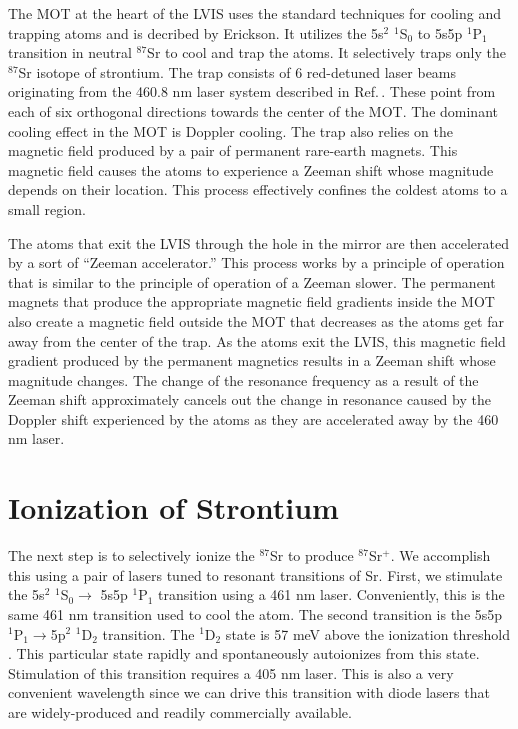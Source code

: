 The MOT at the heart of the LVIS uses the standard techniques for cooling and trapping atoms and is decribed by Erickson\cite{cjeDiss}. It utilizes the 5s$^2$ $^1$S$_0$ to 5s5p $^1$P$_1$ transition in neutral $^{87}$Sr to cool and trap the atoms. It selectively traps only the $^{87}$Sr isotope of strontium. The trap consists of 6 red-detuned laser beams originating from the 460.8 nm laser system described in Ref.\,\cite{cjeDiss}. These point from each of six orthogonal directions towards the center of the MOT. The dominant cooling effect in the MOT is Doppler cooling. 
The trap also relies on the magnetic field produced by a pair of permanent rare-earth magnets. This magnetic field causes the atoms to experience a Zeeman shift whose magnitude depends on their location. This process effectively confines the coldest atoms to a small region. 


The atoms that exit the LVIS through the hole in the mirror are then accelerated by a sort of ``Zeeman accelerator.'' This process works by a principle of operation that is similar to the principle of operation of a Zeeman slower. The permanent magnets that produce the appropriate magnetic field gradients inside the MOT also create a magnetic field outside the MOT that decreases as the atoms get far away from the center of the trap. As the atoms exit the LVIS, this magnetic field gradient produced by the permanent magnetics results in a Zeeman shift whose magnitude changes. The change of the resonance frequency as a result of the Zeeman shift approximately cancels out the change in resonance caused by the Doppler shift experienced by the atoms as they are accelerated away by the 460 nm laser. 

\section{Ionization of Strontium}
 
The next step is to selectively ionize the $^{87}$Sr to produce $^{87}$Sr$^+$. We accomplish this using a pair of lasers tuned to resonant transitions of Sr. First, we stimulate the 5s$^2$ $^1$S$_0 \rightarrow$ 5s5p $^1$P$_1$ transition using a 461 nm laser. Conveniently, this is the same 461 nm transition used to cool the atom. The second transition is the 5s5p $^1$P$_1\rightarrow$5p$^2$ $^1$D$_2$ transition. The $^1$D$_2$ state is 57 meV above the ionization threshold \cite{NSFprop}. This particular state rapidly and spontaneously autoionizes from this state. Stimulation of this transition requires a 405 nm laser. This is also a very convenient wavelength since we can drive this transition with diode lasers that are widely-produced and readily commercially available.

